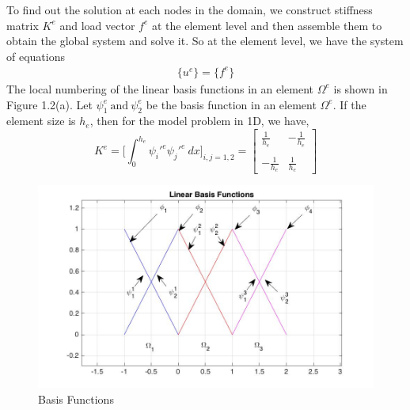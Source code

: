 To find out the solution at each nodes in the domain, we construct stiffness matrix $K^e$ and load vector $f^e$ at the element level and then assemble them to obtain the global system and solve it. So at the element level, we have the system of equations
\begin{eqnarray}
[K^e] \{u^e\} = \{f^e\}
\end{eqnarray}
The local numbering of the linear basis functions in an element $\Omega^e$ is shown in Figure 1.2(a). Let $\psi^e_1 \ \text{and} \ \psi^e_2$ be the basis function in an element $\Omega^e$. If the element size is $h_e$, then for the model problem in 1D, we have,
\begin{equation}
K^e = \Bigg[\int_{0}^{h_e} \psi_i'^e \psi_j'^e \ dx \Bigg]_{i,j=1,2} = 
\begin{bmatrix}
\frac{1}{h_e} & -\frac{1}{h_e} \\\\
-\frac{1}{h_e} & \frac{1}{h_e}
\end{bmatrix}
\end{equation}
\begin{center}
	\begin{figure}[h]
		\centering
		\includegraphics[scale = 0.4]{images/linearbasis.jpg}
		\caption{Basis Functions}
	\end{figure}
\end{center}
\pagebreak
